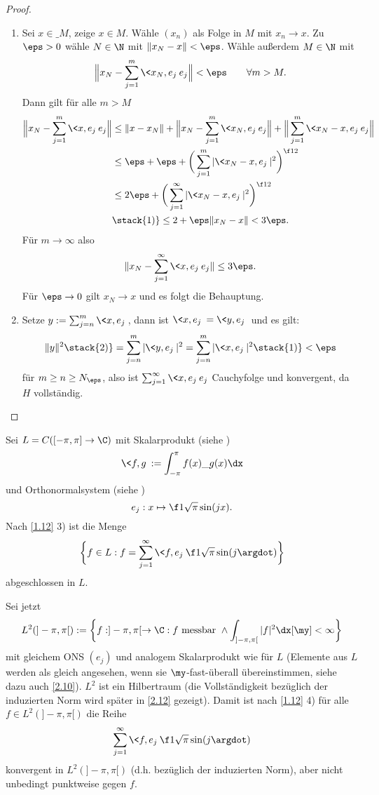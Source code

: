 \begin{st}
\begin{proof}
\begin{enumerate}[1)]
			\item
				Sei $x \in \_M$, zeige $x \in M$.
				Wähle $(x_n)$ als Folge in $M$ mit $x_n \to x$.
				Zu $\eps > 0$ wähle $N\in \N$ mit $\|x_N-x\| < \eps$.
				Wähle außerdem $M \in \N$ mit
				\[
					\Big\|x_N- \sum_{j=1}^m \<x_N,e_j\> e_j \Big\| < \eps
					\qquad \forall m > M.
				\]
				Dann gilt für alle $m > M$
				\begin{align*}
					\Big\|x_N- \sum_{j=1}^m \<x,e_j\> e_j \Big\|
					&\le \|x-x_N\| + \Big\|x_N - \sum_{j=1}^m \<x_N,e_j\> e_j \Big\| + \Big\| \sum_{j=1}^m \<x_N-x,e_j\> e_j \Big\|	\\
					&\le \eps + \eps + \bigg(\sum_{j=1}^m |\<x_N-x,e_j\>|^2 \bigg)^{\f 12} \\
					&\le 2\eps + \bigg(\sum_{j=1}^\infty |\<x_N-x,e_j\>|^2 \bigg)^{\f 12} \\
					&\stack{1)}\le 2 + \eps\|x_N-x\|
					< 3 \eps.
				\end{align*}
				Für $m \to \infty$ also
				\[
					\|x_N - \sum_{j=1}^\infty \<x,e_j\>e_j \| \le 3\eps.
				\]
				Für $\eps \to 0$ gilt $x_N \to x$ und es folgt die Behauptung.
			\item
				Setze $y := \sum_{j=n}^m \<x,e_j\>$, dann ist $\<x,e_j\> = \<y,e_j\>$ und es gilt:
				\begin{align*}
					\|y\|^2
					\stack{2)}= \sum_{j=n}^m |\<y,e_j\>|^2
					= \sum_{j=n}^m |\<x,e_j\>|^2
					\stack{1)}< \eps
				\end{align*}
				für $m\ge n \ge N_\eps$, also ist $\sum_{j=1}^\infty \<x,e_j\> e_j$ Cauchyfolge und konvergent, da $H$ vollständig.
		\end{enumerate}
	\end{proof}
\end{st}

\begin{ex} \label{1.13}
	Sei $L = C([-\pi,\pi] \to \C)$ mit Skalarprodukt (siehe )
	\[
		\<f,g\> := \int_{-\pi}^{\pi}f(x)\_{g(x)} \dx
	\]
	und Orthonormalsystem (siehe )
	\[
		e_j : x \mapsto \f 1{\sqrt{\pi}} \sin(jx).
	\]
	Nach \ref{1.12} 3) ist die Menge
	\[
		\bigg\{ f \in L : f = \sum_{j=1}^\infty \<f,e_j\> \f 1{\sqrt{\pi}}\sin(j \argdot) \bigg\}
	\]
	abgeschlossen in $L$.

	Sei jetzt
	\[
		L^2(]-\pi,\pi[) := \bigg\{ f: ]-\pi,\pi[ \to \C : f \text{ messbar } \land \int_{]-\pi,\pi[}|f|^2 \dx[\my] < \infty \bigg\}
	\]
	mit gleichem ONS $(e_j)$ und analogem Skalarprodukt wie für $L$ (Elemente aus $L$ werden als gleich angesehen, wenn sie $\my$-fast-überall übereinstimmen, siehe dazu auch \ref{2.10}).
	$L^2$ ist ein Hilbertraum (die Vollständigkeit bezüglich der induzierten Norm wird später in \ref{2.12} gezeigt).
	Damit ist nach \ref{1.12} 4) für alle $f \in L^2(]-\pi,\pi[)$ die Reihe
	\[
		\sum_{j=1}^\infty \<f,e_j\> \f 1{\sqrt{\pi}} \sin(j \argdot)
	\]
	konvergent in $L^2(]-\pi,\pi[)$ (d.h. bezüglich der induzierten Norm), aber nicht unbedingt punktweise gegen $f$.
\end{ex}

